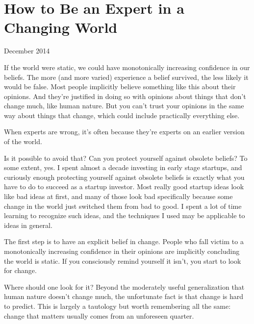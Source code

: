 \chapter{How to Be an Expert in a Changing World}


            
              
                

December 2014

If the world were static, we could
                  have monotonically increasing confidence in our beliefs. The
                  more (and more varied) experience a belief survived, the less
                  likely it would be false. Most people implicitly believe
                  something like this about their opinions. And they're
                  justified in doing so with opinions about things that don't
                  change much, like human nature. But you can't trust your
                  opinions in the same way about things that change, which could
                  include practically everything else.

When experts
                  are wrong, it's often because they're experts on an earlier
                  version of the world.

Is it possible to avoid that?
                  Can you protect yourself against obsolete beliefs? To some
                  extent, yes. I spent almost a decade investing in early stage
                  startups, and curiously enough protecting yourself against
                  obsolete beliefs is exactly what you have to do to succeed as
                  a startup investor. Most really good startup ideas look like
                  bad ideas at first, and many of those look bad specifically
                  because some change in the world just switched them from bad
                  to good. I spent a lot of time learning to recognize such
                  ideas, and the techniques I used may be applicable to ideas in
                  general.

The first step is to have an explicit
                  belief in change. People who fall victim to a monotonically
                  increasing confidence in their opinions are implicitly
                  concluding the world is static. If you consciously remind
                  yourself it isn't, you start to look for change.

Where
                  should one look for it? Beyond the moderately useful
                  generalization that human nature doesn't change much, the
                  unfortunate fact is that change is hard to predict. This is
                  largely a tautology but worth remembering all the same: change
                  that matters usually comes from an unforeseen quarter.

